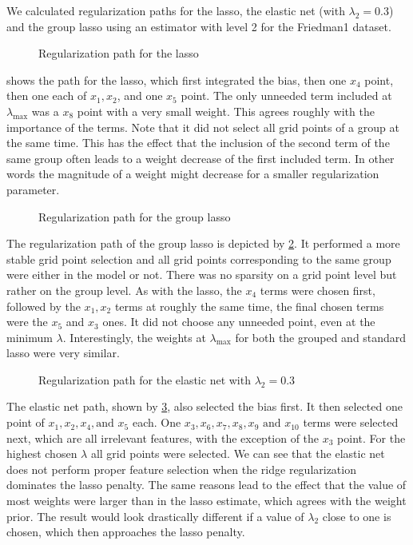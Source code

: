 We calculated regularization paths for the lasso, the elastic net (with
\(\lambda_2 = 0.3\)) and the group lasso using an estimator with level 2 for the
Friedman1 dataset.

\begin{figure}[hbt]
  \caption{Regularization path for the lasso}\label{fig:path-lasso}
\end{figure}
 shows the path for the lasso, which first integrated the bias, then one \(x_4\) point, then
one each of \(x_1, x_2\), and one \(x_5\) point.
The only unneeded term included at \(\lambda_\text{max}\) was a \(x_8\) point with a very small weight.
This agrees roughly with the importance of the terms.
Note that it did not select all grid points of a group at the same time.
This has the effect that the inclusion of the second term of the same group often leads to a weight decrease of the first included term.
In other words the magnitude of a weight might decrease for a smaller regularization parameter.

\begin{figure}[hbt]
  \caption{Regularization path for the group lasso}\label{fig:path-grp}
\end{figure}

The regularization path of the group lasso is depicted by \cref{fig:path-grp}.
It performed a more stable grid point selection and all grid points
corresponding to the same group were either in the model or not.
There was no sparsity on a grid point level but rather on the group level.
As with the lasso, the \(x_4\) terms were chosen first, followed by the \(x_1,
x_2\) terms at roughly the same time, the final chosen terms were the \(x_5\) and
\(x_3\) ones.
It did not choose any unneeded point, even at the minimum \(\lambda\).
Interestingly, the weights at \(\lambda_\text{max}\) for both the grouped and
standard lasso were very similar.

\begin{figure}[hbt]
  \caption{Regularization path for the elastic net with \(\lambda_2 = 0.3\)}\label{fig:path-en}
\end{figure}

The elastic net path, shown by \cref{fig:path-en}, also selected the bias first.
It then selected one point of \(x_1, x_2, x_4,\text{and } x_5\) each.
One \(x_3, x_6, x_7, x_8, x_9 \text{ and } x_{10}\) terms were selected next,
which are all irrelevant features, with the exception of the \(x_3\) point.
For the highest chosen \(\lambda\) all grid points were selected.
We can see that the elastic net does not perform proper feature selection when the ridge regularization dominates the lasso penalty.
The same reasons lead to the effect that the value of most weights were larger than in the lasso estimate, which agrees with the weight prior.
The result would look drastically different if a value of \(\lambda_2\) close to one is chosen, which then approaches the lasso penalty.

